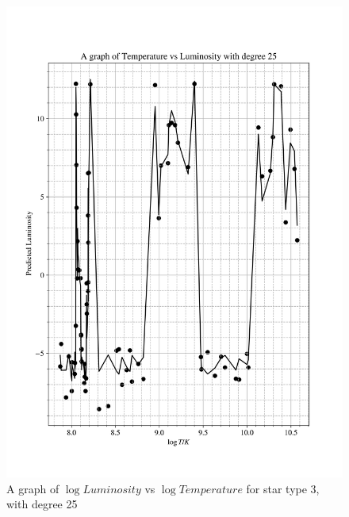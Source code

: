 \documentclass[12pt, a4paper]{article}
\begin{document}
\begin{figure}[H]
    \centering
    \includegraphics[width = \textwidth]{2Plot4_25.png}
    \caption{A graph of \(\log{Luminosity}\) vs \(\log{Temperature}\) for star type 3, with degree 25}
\end{figure}
\end{document}
